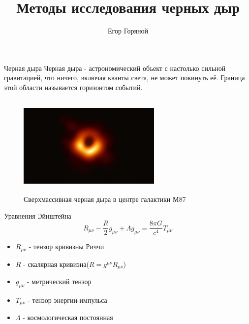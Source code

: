 \documentclass[
]{beamer}
\title{Методы исследования черных дыр}
\author[]{Егор Горяной}
\begin{document}
\begin{frame}[plain]
\maketitle
\end{frame}
\begin{frame}{Черная дыра}
Черная дыра - астрономический объект с настолько сильной гравитацией, что ничего, включая кванты света, не может покинуть её. Граница этой области называется горизонтом событий.
\begin{figure}[H]
	\centering
	\includegraphics[width=7cm, height=5cm]{Black_hole_-_Messier_87.jpg}
	\caption{Сверхмассивная черная дыра в центре галактики М87}
\end{figure}
\end{frame}


\begin{frame}{Уравнения Эйнштейна}
\[R_{\mu\nu}-\frac{R}{2}g_{\mu\nu}+\Lambda g_{\mu\nu}=\frac{8\pi G}{c^4}T_{\mu\nu}\]
\begin{itemize}
    \item $R_{\mu\nu}$ - тензор кривизны Риччи
    \item $R$ - скалярная кривизна($R=g^{\mu\nu}R_{\mu\nu}$)
    \item $g_{\mu\nu}$ - метрический тензор
    \item $T_{\mu\nu}$ - тензор энергии-импульса
    \item $\Lambda$ - космологическая постоянная
\end{itemize}
\end{frame}
\end{document}

